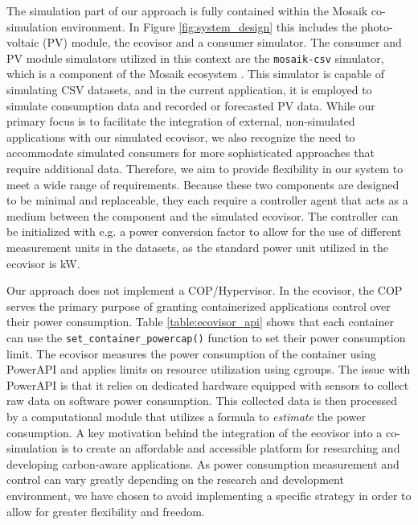 The simulation part of our approach is fully contained within the Mosaik
co-simulation environment. In Figure \ref{fig:system_design} this includes the
photo-voltaic (PV) module, the ecovisor and a consumer simulator. The consumer
and PV module simulators utilized in this context are the \texttt{mosaik-csv}
simulator, which is a component of the Mosaik ecosystem \cite{mosaik_ecosystem}.
This simulator is capable of simulating CSV datasets, and in the current
application, it is employed to simulate consumption data and recorded or
forecasted PV data. While our primary focus is to facilitate the integration of
external, non-simulated applications with our simulated ecovisor, we also
recognize the need to accommodate simulated consumers for more sophisticated
approaches that require additional data. Therefore, we aim to provide
flexibility in our system to meet a wide range of requirements. Because these
two components are designed to be minimal and replaceable, they each require a
controller agent that acts as a medium between the component and the simulated
ecovisor. The controller can be initialized with e.g. a power conversion factor
to allow for the use of different measurement units in the datasets, as the
standard power unit utilized in the ecovisor is kW.

Our approach does not implement a COP/Hypervisor. In the ecovisor, the COP
serves the primary purpose of granting containerized applications control over
their power consumption. Table \ref{table:ecovisor_api} shows that each
container can use the \texttt{set\_container\_powercap()} function to set their
power consumption limit. The ecovisor measures the power consumption of the
container using PowerAPI \cite{bourdon2013} and applies limits on resource
utilization using cgroups. The issue with PowerAPI is that it relies on
dedicated hardware equipped with sensors to collect raw data on software power
consumption. This collected data is then processed by a computational module
that utilizes a formula to \emph{estimate} the power consumption. A key
motivation behind the integration of the ecovisor into a co-simulation is to
create an affordable and accessible platform for researching and developing
carbon-aware applications. As power consumption measurement and control can vary
greatly depending on the research and development environment, we have chosen to
avoid implementing a specific strategy in order to allow for greater flexibility
and freedom.

